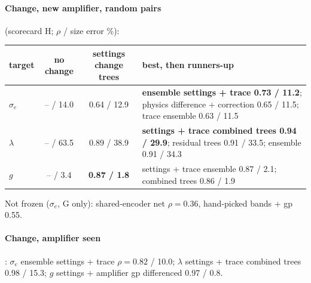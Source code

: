 \documentclass[10pt,a4paper]{article}
\begin{document}
\paragraph{Change, new amplifier, random pairs} (scorecard H; $\rho$ / size error \%):
\begin{center}\small
\begin{tabularx}{\linewidth}{@{}lccX@{}}\toprule
target & no change & settings change trees & best, then runners-up\\\midrule
$\sigma_e$ & -- / 14.0 & 0.64 / 12.9 & \textbf{ensemble settings + trace 0.73 / 11.2}; physics difference + correction 0.65 / 11.5; trace ensemble 0.63 / 11.5\\
$\lambda$ & -- / 63.5 & 0.89 / 38.9 & \textbf{settings + trace combined trees 0.94 / 29.9}; residual trees 0.91 / 33.5; ensemble 0.91 / 34.3\\
$g$ & -- / 3.4 & \textbf{0.87 / 1.8} & settings + trace ensemble 0.87 / 2.1; combined trees 0.86 / 1.9\\\bottomrule
\end{tabularx}
\end{center}
Not frozen ($\sigma_e$, G only): shared-encoder net $\rho=0.36$, hand-picked bands + gp 0.55.

\paragraph{Change, amplifier seen}: $\sigma_e$ ensemble settings + trace $\rho=0.82$ / 10.0; $\lambda$ settings + trace combined trees
0.98 / 15.3; $g$ settings + amplifier gp differenced 0.97 / 0.8.
\end{document}
